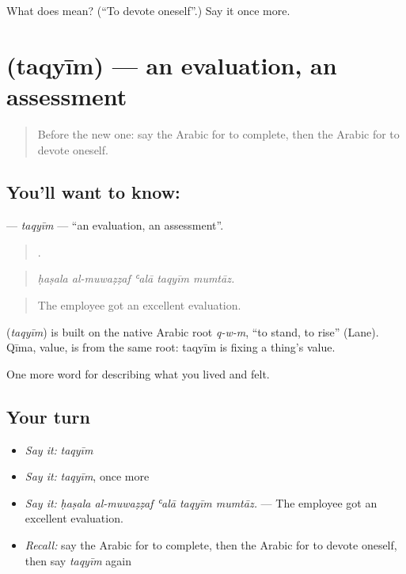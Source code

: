 \begin{tcolorbox}[breakable,colback=teal!4,colframe=teal!35!black,title={Before you move on}]
What does  mean? (\textquotedblleft{}To devote oneself\textquotedblright{}.) Say it once more.
\end{tcolorbox}
\section[\texorpdfstring{\ar{تقييم} (taqyīm)}{تقييم (taqyīm)}]{ (taqyīm) — an evaluation, an assessment}

\label{lesson:AR-C523-taqyim}



\begin{quote}
Before the new one: say the Arabic for to complete, then the Arabic for to devote oneself.
\end{quote}

\subsection*{You'll want to know: }
\textbf{} — \emph{taqyīm} — \textquotedblleft{}an evaluation, an assessment\textquotedblright{}.

\begin{quote}
    .
\end{quote}

\begin{quote}
\emph{ḥaṣala al-muwaẓẓaf ʿalā taqyīm mumtāz.}
\end{quote}

\begin{quote}
The employee got an excellent evaluation.
\end{quote}

\begin{cousinweb}
\textbf{} (\emph{taqyīm}) is built on the native Arabic root \emph{q-w-m}, \textquotedblleft{}to stand, to rise\textquotedblright{} (Lane). Qīma, value, is from the same root: taqyīm is fixing a thing's value.
\end{cousinweb}

\begin{grammarlens}[title={What you've built}]
One more word for describing what you lived and felt.
\end{grammarlens}

\subsection*{Your turn}
\begin{itemize}
\raggedright
  \item \emph{Say it:} \emph{taqyīm}
  \item \emph{Say it:} \emph{taqyīm}, once more
  \item \emph{Say it:} \emph{ḥaṣala al-muwaẓẓaf ʿalā taqyīm mumtāz.} — The employee got an excellent evaluation.
  \item \emph{Recall:} say the Arabic for to complete, then the Arabic for to devote oneself, then say \emph{taqyīm} again
\end{itemize}


